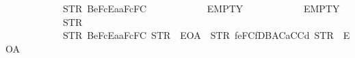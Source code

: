 \begin{isabellebody}
\ \ \ \ \ \ \ \ \ \ \ \ {\isacharparenleft}{\kern0pt}STR\ {\isacharprime}{\kern0pt}{\isacharprime}{\kern0pt}{}{}{}Be{}{}{}{}FcEa{}{}aF{}{}{}{}{}{}{}{}{}c{}{}F{}{}{}{}{}{}C{}{}{}{\isacharprime}{\kern0pt}{\isacharprime}{\kern0pt}{\isacharparenright}{\kern0pt}\isanewline
\ \ \ \ \ \ \ \ \ \ \ \ EMPTY\isanewline
\ \ \ \ \ \ \ \ \ \ \ \ EMPTY\isanewline
\ \ \ \ \ \ \ \ \ \ \ \ {\isacharparenleft}{\kern0pt}STR\ {\isacharprime}{\kern0pt}{\isacharprime}{\kern0pt}{}{\isacharprime}{\kern0pt}{\isacharprime}{\kern0pt}{\isacharparenright}{\kern0pt}\isanewline
\ \ \ \ \ \ \ \ \ \ \ \ {\isacharbrackleft}{\kern0pt}{\isacharparenleft}{\kern0pt}STR\ {\isacharprime}{\kern0pt}{\isacharprime}{\kern0pt}{}{}{}Be{}{}{}{}FcEa{}{}aF{}{}{}{}{}{}{}{}{}c{}{}F{}{}{}{}{}{}C{}{}{}{\isacharprime}{\kern0pt}{\isacharprime}{\kern0pt}{\isacharcomma}{\kern0pt}\ STR\ {\isacharprime}{\kern0pt}{\isacharprime}{\kern0pt}{}{}{}{\isacharprime}{\kern0pt}{\isacharprime}{\kern0pt}{\isacharcomma}{\kern0pt}\ EOA{\isacharcomma}{\kern0pt}\ {}{\isacharparenright}{\kern0pt}{\isacharcomma}{\kern0pt}\ {\isacharparenleft}{\kern0pt}STR\ {\isacharprime}{\kern0pt}{\isacharprime}{\kern0pt}{}{}{}f{}e{}F{}{}{}{}{}C{}{}f{}DB{}AC{}{}{}{}{}a{}CC{}{}{}{}{}d{}{}{\isacharprime}{\kern0pt}{\isacharprime}{\kern0pt}{\isacharcomma}{\kern0pt}\ STR\ {\isacharprime}{\kern0pt}{\isacharprime}{\kern0pt}{}{}{}{\isacharprime}{\kern0pt}{\isacharprime}{\kern0pt}{\isacharcomma}{\kern0pt}\ EOA{\isacharcomma}{\kern0pt}\ {}{\isacharparenright}{\kern0pt}{\isacharbrackright}{\kern0pt}\ \isanewline

\end{isabellebody}
